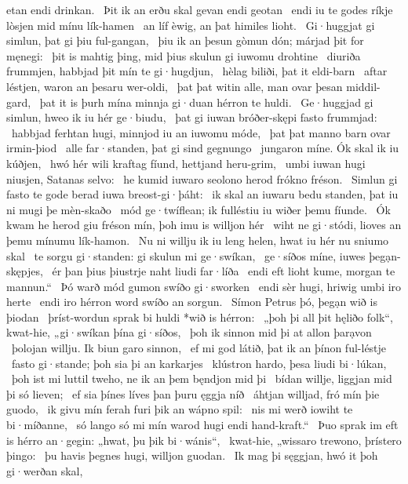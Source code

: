 etan endi drinkan. \hld\ Þit ik an erðu skal
gevan endi geotan \hld\ endi iu te godes ríkje
lòsjen mid mínu lík-hamen \hld\ an líf èwig,
an þat himiles lioht. \hld\ Gi·huggjat gi simlun,
þat gi þiu ful-gangan, \hld\ þiu ik an þesun gòmun dón;
márjad þit for męnegi: \hld\ þit is mahtig þing,
mid þius skulun gi iuwomu drohtine \hld\ diuriða frummjen,
habbjad þit mín te gi·hugdjun, \hld\ hèlag biliði,
þat it eldi-barn \hld\ aftar léstjen,
waron an þesaru wer-oldi, \hld\ þat þat witin alle,
man ovar þesan middil-gard, \hld\ þat it is þurh mína minnja gi·duan
hérron te huldi. \hld\ Ge·huggjad gi simlun,
hweo ik iu hér ge·biudu, \hld\ þat gi iuwan bróðer-skępi
fasto frummjad: \hld\ habbjad ferhtan hugi,
minnjod iu an iuwomu móde, \hld\ þat þat manno barn
ovar irmin-þiod \hld\ alle far·standen,
þat gi sind gegnungo \hld\ jungaron míne.
Ók skal ik iu kúðjen, \hld\ hwó hér wili kraftag fíund,
hettjand heru-grim, \hld\ umbi iuwan hugi niusjen,
Satanas selvo: \hld\ he kumid iuwaro seolono herod
frókno fréson. \hld\ Simlun gi fasto te gode
berad iuwa breost-gi·þáht: \hld\ ik skal an iuwaru bedu standen,
þat iu ni mugi þe mèn-skaðo \hld\ mód ge·twíflean;
ik fulléstiu iu wiðer þemu fíunde. \hld\ Ók kwam he herod giu fréson mín,
þoh imu is willjon hér \hld\ wiht ne gi·stódi,
lioves an þemu mínumu lík-hamon. \hld\ Nu ni willju ik iu leng helen,
hwat iu hér nu sniumo skal \hld\ te sorgu gi·standen:
gi skulun mi ge·swíkan, \hld\ ge·síðos míne,
iuwes þegạn-skępjes, \hld\ ér þan þius þiustrje naht
liudi far·líða \hld\ endi eft lioht kume,
morgan te mannun.“ \hld\ Þó warð mód gumon
swíðo gi·sworken \hld\ endi sèr hugi,
hriwig umbi iro herte \hld\ endi iro hérron word
swíðo an sorgun. \hld\ Símon Petrus þó,
þegạn wið is þiodan \hld\ þríst-wordun sprak
bi huldi *wið is hérron: \hld\ „þoh þi all þit hęliðo folk“, kwat-hie,
„gi·swíkan þína gi·síðos, \hld\ þoh ik sinnon mid þi
at allon þarạvon \hld\ þolojan willju.
Ik biun garo sinnon, \hld\ ef mi god látið,
þat ik an þínon ful-léstje \hld\ fasto gi·stande;
þoh sia þi an karkarjes \hld\ klústron hardo,
þesa liudi bi·lúkan, \hld\ þoh ist mi luttil tweho,
ne ik an þem bęndjon mid þi \hld\ bídan willje,
liggjan mid þi só lieven; \hld\ ef sia þínes líves þan
þuru ęggja níð \hld\ áhtjan willjad,
fró mín þie guodo, \hld\ ik givu mín ferah furi þik
an wápno spil: \hld\ nis mi werð iowiht
te bi·míðanne, \hld\ só lango só mi mín warod
hugi endi hand-kraft.“ \hld\ Þuo sprak im eft is hérro an·gegin:
„hwat, þu þik bi·wánis“, \hld\ kwat-hie, „wissaro trewono,
þrístero þingo: \hld\ þu havis þegnes hugi,
willjon guodan. \hld\ Ik mag þi sęggjan, hwó it þoh gi·werðan skal,

